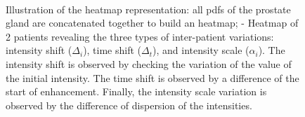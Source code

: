 \begin{figure}
  \centering
  \hspace*{\fill}
   \hfill
  \hspace*{\fill}
  \\
  \hspace*{\fill}
   \hfill
   \hfill
  \hspace*{\fill}
  \caption{ Illustration of the heatmap
    representation: all \ac*{pdf}s of the prostate gland are
    concatenated together to build an heatmap;
    - Heatmap of 2 patients
    revealing  the three types of inter-patient variations: intensity shift
    ($\Delta_i$), time shift ($\Delta_t$), and intensity scale
    ($\alpha_i$). The intensity shift is observed by checking the
    variation of the value of the initial intensity. The time shift
    is observed by a difference of the start of enhancement. Finally,
    the intensity scale variation is observed by the difference of
    dispersion of the intensities.}
  \label{fig:heatmap}
\end{figure}

